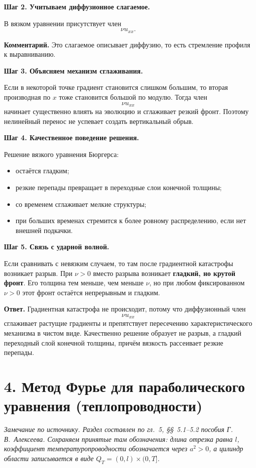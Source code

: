 \documentclass[a4paper,12pt]{article}
\begin{document}
\textbf{Шаг 2. Учитываем диффузионное слагаемое.}

В вязком уравнении присутствует член
\[
\nu u_{xx}.
\]

\textbf{Комментарий.} Это слагаемое описывает диффузию, то есть стремление профиля к выравниванию.

\textbf{Шаг 3. Объясняем механизм сглаживания.}

Если в некоторой точке градиент становится слишком большим, то вторая производная по $x$ тоже становится большой по модулю. Тогда член
\[
\nu u_{xx}
\]
начинает существенно влиять на эволюцию и сглаживает резкий фронт. Поэтому нелинейный перенос не успевает создать вертикальный обрыв.

\textbf{Шаг 4. Качественное поведение решения.}

Решение вязкого уравнения Бюргерса:
\begin{itemize}
  \item остаётся гладким;
  \item резкие перепады превращает в переходные слои конечной толщины;
  \item со временем сглаживает мелкие структуры;
  \item при больших временах стремится к более ровному распределению, если нет внешней подкачки.
\end{itemize}

\textbf{Шаг 5. Связь с ударной волной.}

Если сравнивать с невязким случаем, то там после градиентной катастрофы возникает разрыв. При $\nu>0$ вместо разрыва возникает \textbf{гладкий, но крутой фронт}. Его толщина тем меньше, чем меньше $\nu$, но при любом фиксированном $\nu>0$ этот фронт остаётся непрерывным и гладким.

\textbf{Ответ.}
Градиентная катастрофа не происходит, потому что диффузионный член
\[
\nu u_{xx}
\]
сглаживает растущие градиенты и препятствует пересечению характеристического механизма в чистом виде. Качественно решение образует не разрыв, а гладкий переходный слой конечной толщины, причём вязкость рассеивает резкие перепады.

\section*{4. Метод Фурье для параболического уравнения (теплопроводности)}

\textit{Замечание по источнику. Раздел составлен по гл.~5, \S\S~5.1--5.2 пособия Г.\,В.~Алексеева. Сохраняем принятые там обозначения: длина отрезка равна $l$, коэффициент температуропроводности обозначается через $a^2>0$, а цилиндр области записывается в виде $Q_T=(0,l)\times(0,T]$.}
\end{document}
